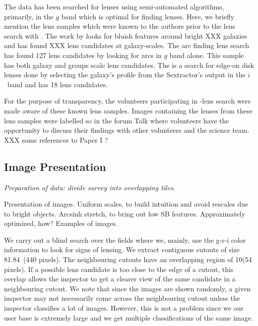 \documentclass[useAMS,usenatbib,a4paper]{mn2e}
\begin{document}
The \cfhtls data has been searched for lenses using semi-automated
algorithms, primarily, in the $g$ band which is optimal for finding
lenses. Here, we briefly mention the lens samples which were known to
the authors prior to the lens search with \sw.
The work
by \citet{Gavazzi2013} looks for bluish features around bright XXX
galaxies and has found XXX lens candidates at galaxy-scales.  The arc
finding lens search \citet{More2012} has found 127 lens candidates by
looking for arcs in $g$ band alone. This sample has both galaxy and
groups scale lens candidates. The \citet{Sygnet2009} is a search for
edge-on disk lenses done by selecting the galaxy's profile from the
Sextractor's output in the $i$~band and has 18 lens candidates.

For the purpose of transparency, the volunteers participating in
\sw-\cfhtls lens search were made aware of these known lens samples. Images
containing the lenses from these lens samples were labelled so in the
forum Talk where volunteers have the opportunity to discuss their
findings with other volunteers and the science team. XXX some references
to Paper I ?



\subsection{Image Presentation}
\label{sec:data:impres}
{\it Preparation of data: divide survey into overlapping tiles. 

Presentation of images. Uniform scales, to build intuition and avoid rescales
due to bright objects. Arcsinh stretch, to bring out low SB features. 
Approximately optimized, how? Examples of images.}

We carry out a blind search over the \cfhtls fields where we, mainly, use
the g-r-i color information to look for signs of lensing. We extract
contiguous cutouts of size 81.84\arcsec\ (440 pixels). The neighbouring
cutouts have an overlapping region of 10\arcsec (54 pixels). If a
possible lens candidate is too close to the edge of a cutout, this
overlap allows the inspector to get a clearer view of the same candidate
in a neighbouring cutout. We note that since the images are shown
randomly, a given inspector may not necessarily come across the
neighbouring cutout unless the inspector classifies a lot of images.
However, this is not a problem since we our user base is extremely large
and we get multiple classifications of the same image.
\end{document}
